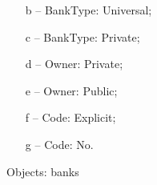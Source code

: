 \documentclass[12pt]{report}
\begin{document}
\begin{solution}
\begin{multicols}{3}
\begin{itemize}
        \item[{\large b --}] BankType: Universal;
        \item[{\large c --}] BankType: Private;
        \item[{\large d --}] Owner: Private;
        \item[{\large e --}] Owner: Public;
        \item[{\large f --}] Code: Explicit;
        \item[{\large g --}] Code: No.
    \end{itemize}
    {\large Objects:} banks
\end{multicols}
\begin{figure}[h!]
    \centering
    \begin{tikzpicture}[x=0.75pt,y=0.75pt,yscale=-1,xscale=1]
        

\end{tikzpicture}
\end{figure}
\end{solution}
\end{document}
